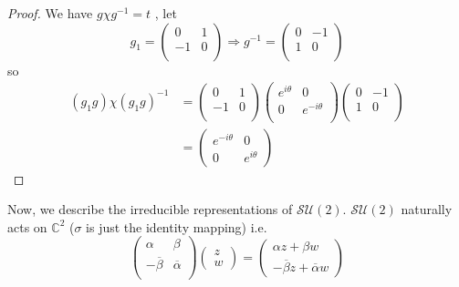 \documentclass{article}
\begin{document}
\begin{proof}
    We have $g \chi g^{-1} = t$ , let
    \[
        g_1 = 
        \begin{pmatrix}
            0 & 1 \\
            -1 & 0 \\
        \end{pmatrix}
        \Rightarrow
        g^{-1} = 
        \begin{pmatrix}
            0 & -1 \\
            1 & 0 \\
        \end{pmatrix}
    \]
    so 
    \[
        \begin{split}
            (g_1 g) \chi (g_1 g)^{-1} &= 
            \begin{pmatrix}
                0 & 1 \\
                -1 & 0 \\
            \end{pmatrix}
            \begin{pmatrix}
                e^{i\theta} & 0 \\
                0 & e^{-i\theta} \\
            \end{pmatrix}
            \begin{pmatrix}
                0 & -1 \\
                1 & 0 \\
            \end{pmatrix} \\
                                      &=
            \begin{pmatrix}
                e^{-i\theta} & 0 \\
                0 & e^{i\theta}
            \end{pmatrix}
        \end{split}
    \]
\end{proof}

Now, we describe the irreducible representations of $\mathcal{SU}(2)$. $\mathcal{SU}(2)$ naturally acts on $\mathbb{C}^{2}$ ($\sigma$ is just the identity mapping) i.e.
\begin{equation}
    \begin{pmatrix}
        \alpha & \beta \\
        -\overline{\beta} & \overline{\alpha} \\
    \end{pmatrix}
    \begin{pmatrix}
        z \\ w
    \end{pmatrix} 
    = 
    \begin{pmatrix}
        \alpha z + \beta w \\
        - \overline{\beta}z + \overline{\alpha}w
    \end{pmatrix}
\end{equation}
\end{document}
